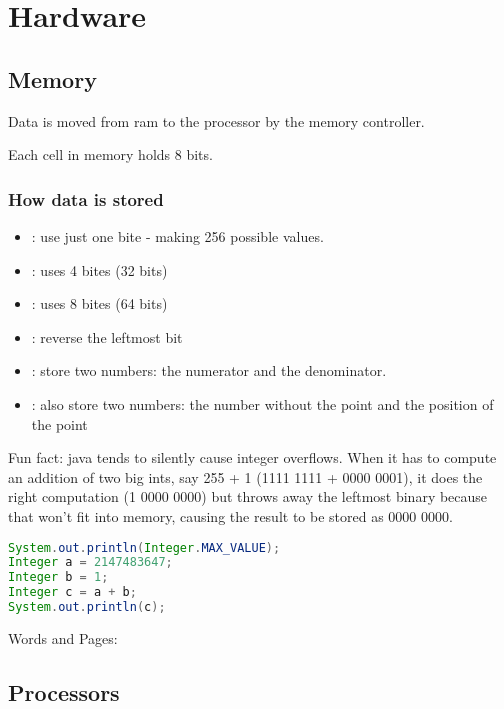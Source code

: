 \section{Hardware}

\subsection{Memory}


Data is moved from ram to the processor by the memory controller. 


Each cell in memory holds 8 bits. 

\subsubsection{How data is stored}

\begin{itemize}
    \item  {}: use just one bite - making 256 possible values. 
   \item  {}: uses 4 bites (32 bits)
   \item  {}: uses 8 bites (64 bits)
   \item  {}: reverse the leftmost bit
   \item  {}: store two numbers: the numerator and the denominator. 
   \item  {}: also store two numbers: the number without the point and the position of the point
\end{itemize}


Fun fact: java tends to silently cause integer overflows. When it has to compute an addition of two big ints, say 255 + 1 (1111 1111 + 0000 0001), it does the right computation (1 0000 0000) but throws away the leftmost binary because that won't fit into memory, causing the result to be stored as 0000 0000. 

\begin{lstlisting}[language=java]
System.out.println(Integer.MAX_VALUE);   
Integer a = 2147483647;
Integer b = 1;
Integer c = a + b;
System.out.println(c);
\end{lstlisting}


Words and Pages:



\subsection{Processors}

